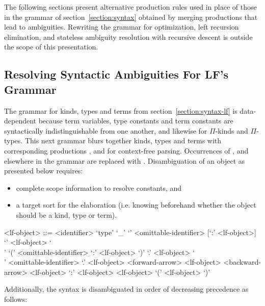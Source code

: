 The following sections present alternative production rules used in place of those in the grammar of section~\ref{section:syntax} obtained by merging productions that lead to ambiguities.
Rewriting the grammar for optimization, left recursion elimination, and stateless ambiguity resolution with recursive descent is outside the scope of this presentation.

\subsection{Resolving Syntactic Ambiguities For \acs{LF}'s Grammar}

The grammar for \LF kinds, types and terms from section~\ref{section:syntax-lf} is data-dependent because \LF term variables, type constants and term constants are syntactically indistinguishable from one another, and likewise for $ \Pi $-kinds and $ \Pi $-types.
This next grammar blurs together \LF kinds, types and terms with corresponding productions ,  and  for context-free parsing.
Occurrences of ,  and  elsewhere in the grammar are replaced with .
Disambiguation of an \LF object as presented below requires:
\begin{itemize}
\item complete scope information to resolve constants, and
\item a target sort for the elaboration (i.e. knowing beforehand whether the \LF object should be a kind, type or term).
\end{itemize}

\begin{grammar}
<lf-object> ::= <identifier>
\alt `type'
\alt `_'
\alt `{' <omittable-identifier> [`:' <lf-object>] `}' <lf-object>
\alt `\\' `(' <omittable-identifier> `:' <lf-object> `)' `.' <lf-object>
\alt `\\' <omittable-identifier> `.' <lf-object>
 <forward-arrow> <lf-object>
 <backward-arrow> <lf-object>
 `:' <lf-object>
 <lf-object>
\alt `(' <lf-object> `)'
\end{grammar}

Additionally, the syntax is disambiguated in order of decreasing precedence as follows:


